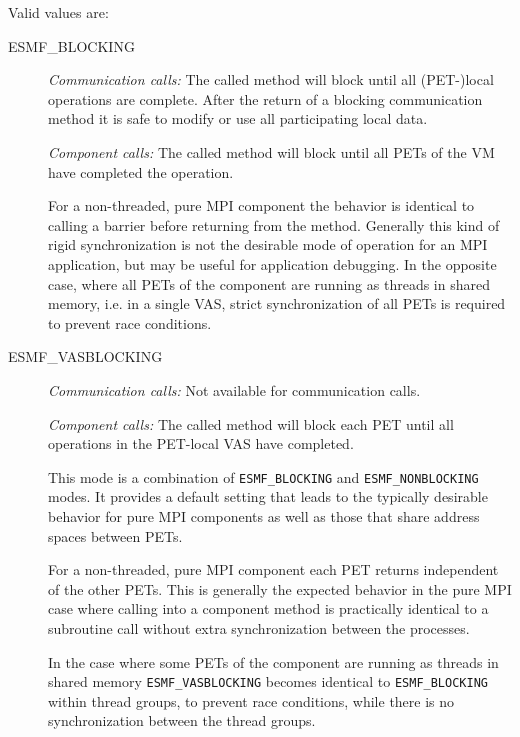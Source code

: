 Valid values are:
\begin{description}

\item [ESMF\_BLOCKING]
         {\em Communication calls:} The called method will block until all
         (PET-)local operations are complete. After the return of a blocking
         communication method it is safe to modify or use all participating
         local data.
         
         {\em Component calls:} The called method will block until all PETs of
         the VM have completed the operation.
         
         For a non-threaded, pure MPI
         component the behavior is identical to calling a barrier before 
         returning from the method. Generally this kind of rigid 
         synchronization is not the desirable mode of operation for an MPI
         application, but may be useful for application debugging.
         In the opposite case, where all PETs of the component are running as
         threads in shared memory, i.e. in a single VAS, strict synchronization
         of all PETs is required to prevent race conditions.

\item [ESMF\_VASBLOCKING]
         {\em Communication calls:} Not available for communication calls.
         
         {\em Component calls:} The called method will block each PET until
         all operations in the PET-local VAS have completed. 
         
         This mode is a combination of {\tt ESMF\_BLOCKING} and
         {\tt ESMF\_NONBLOCKING} modes. It provides a default setting 
         that leads to the typically desirable behavior for pure MPI 
         components as well as those that share address spaces between PETs.
         
         For a non-threaded, pure MPI component each PET returns
         independent of the other PETs. This is generally the expected 
         behavior in the pure MPI case where calling into a component method is
         practically identical to a subroutine call without extra 
         synchronization between the processes.
         
         In the case where some PETs of the component are running as
         threads in shared memory {\tt ESMF\_VASBLOCKING} becomes identical
         to {\tt ESMF\_BLOCKING} within thread groups, to prevent race
         conditions, while there is no synchronization between the thread
         groups.
         

\end{description}
